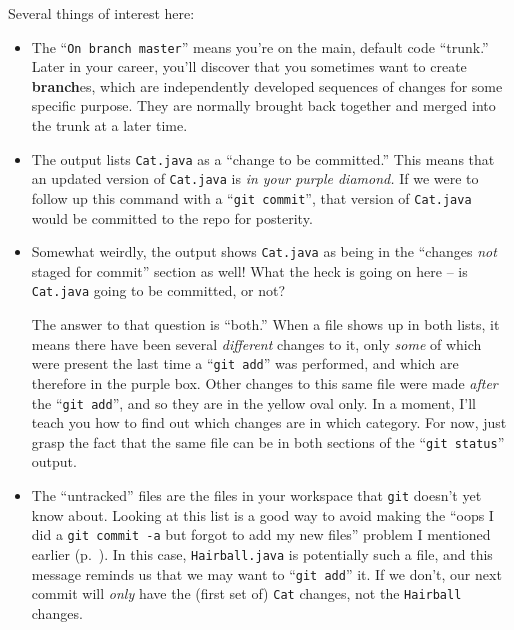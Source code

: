 \pagebreak
Several things of interest here:

\begin{itemize}

\item The ``\texttt{On branch master}'' means you're on the main, default code
``trunk.'' Later in your career, you'll discover that you sometimes want to
create \textbf{branch}es, which are independently developed sequences of
changes for some specific purpose. They are normally brought back together and
merged into the trunk at a later time.

\item The output lists \texttt{Cat.java} as a ``change to be committed.'' This
means that an updated version of \texttt{Cat.java} is \textit{in your purple
diamond.} If we were to follow up this command with a ``\texttt{git commit}'',
that version of \texttt{Cat.java} would be committed to the repo for
posterity.

\item Somewhat weirdly, the output shows \texttt{Cat.java} as being in the
``changes \textit{not} staged for commit'' section as well! What the heck is
going on here -- is \texttt{Cat.java} going to be committed, or not?

The answer to that question is ``both.'' When a file shows up in both lists,
it means there have been several \textit{different} changes to it, only
\textit{some} of which were present the last time a ``\texttt{git add}'' was
performed, and which are therefore in the purple box. Other changes to this
same file were made \textit{after} the ``\texttt{git add}'', and so they are
in the yellow oval only. In a moment, I'll teach you how to find out which
changes are in which category. For now, just grasp the fact that the same file
can be in both sections of the ``\texttt{git status}'' output.

\item The ``untracked'' files are the files in your workspace that
\texttt{git} doesn't yet know about. Looking at this list is a good way to
avoid making the ``oops I did a \texttt{git commit -a} but forgot to add my
new files'' problem I mentioned earlier (p.~\pageref{commitPitfall}). In this
case, \texttt{Hairball.java} is potentially such a file, and this message
reminds us that we may want to ``\texttt{git add}'' it. If we don't, our next
commit will \textit{only} have the (first set of) \texttt{Cat} changes, not
the \texttt{Hairball} changes.


\end{itemize}
